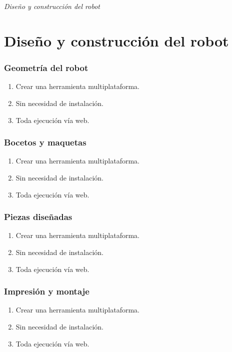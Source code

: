 \documentclass{beamer}
\begin{document}
\section*{}
\begin{frame}{}
	\centering \Huge
	\emph{Diseño y construcción del robot}
\end{frame}

\section{Diseño y construcción del robot}
\begin{frame}
	\frametitle{Geometría del robot}
	\begin{enumerate}
		\item Crear una herramienta multiplataforma.
		\item Sin necesidad de instalación.
		\item Toda ejecución vía web.
	\end{enumerate}
\end{frame}

\begin{frame}
	\frametitle{Bocetos y maquetas}
	\begin{enumerate}
		\item Crear una herramienta multiplataforma.
		\item Sin necesidad de instalación.
		\item Toda ejecución vía web.
	\end{enumerate}
\end{frame}

\begin{frame}
	\frametitle{Piezas diseñadas}
	\begin{enumerate}
		\item Crear una herramienta multiplataforma.
		\item Sin necesidad de instalación.
		\item Toda ejecución vía web.
	\end{enumerate}
\end{frame}

\begin{frame}
	\frametitle{Impresión y montaje}
	\begin{enumerate}
		\item Crear una herramienta multiplataforma.
		\item Sin necesidad de instalación.
		\item Toda ejecución vía web.
	\end{enumerate}
\end{frame}
\end{document}

